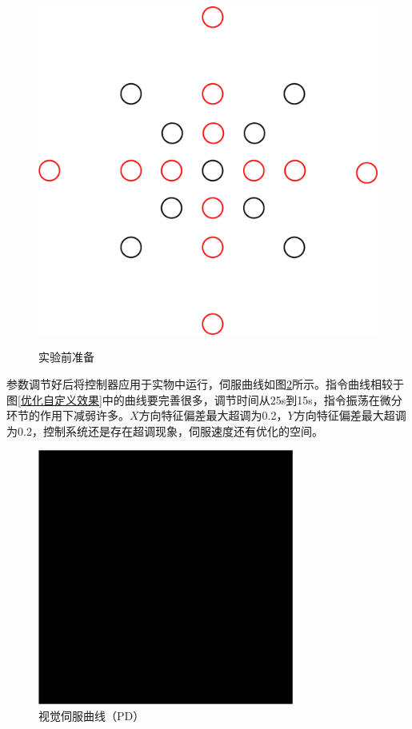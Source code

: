 \documentclass[fontset=fandol,type=bachelor,campus=harbin,bsmainpagenumberline=true]{hithesisbook}
\begin{document}
\begin{figure}[h]
{\begin{minipage}[h]{0.36\textwidth}
			\includegraphics[width=1\textwidth]{chapter5/绘制曲线选取特征点}
		\end{minipage}
		\label{绘制曲线选取特征点}
	}
	\caption{实验前准备}
	\label{实验前准备}
\end{figure}


参数调节好后将控制器应用于实物中运行，伺服曲线如图\ref{视觉伺服曲线（PD）}所示。指令曲线相较于图\ref{优化自定义效果}中的曲线要完善很多，调节时间从25s到15s，指令振荡在微分环节的作用下减弱许多。$X$方向特征偏差最大超调为0.2，$Y$方向特征偏差最大超调为0.2，控制系统还是存在超调现象，伺服速度还有优化的空间。
\begin{figure}[h]
	\centering
	\includegraphics[width=0.75\textwidth]{chapter5/替身}
	\caption{视觉伺服曲线（PD）}
	\label{视觉伺服曲线（PD）}
\end{figure}
\end{document}
